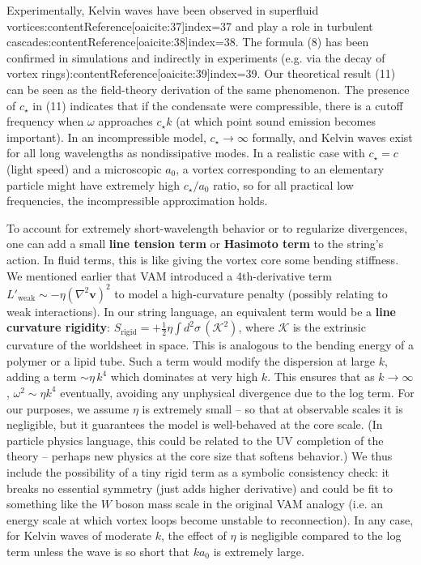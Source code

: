 \documentclass[12pt]{article}
\begin{document}
Experimentally, Kelvin waves have been observed in superfluid vortices:contentReference[oaicite:37]{index=37} and play a role in turbulent cascades:contentReference[oaicite:38]{index=38}. The formula (8) has been confirmed in simulations and indirectly in experiments (e.g. via the decay of vortex rings):contentReference[oaicite:39]{index=39}. Our theoretical result (11) can be seen as the field-theory derivation of the same phenomenon. The presence of $c_\star$ in (11) indicates that if the condensate were compressible, there is a cutoff frequency when $\omega$ approaches $c_\star k$ (at which point sound emission becomes important). In an incompressible model, $c_\star \to \infty$ formally, and Kelvin waves exist for all long wavelengths as nondissipative modes. In a realistic case with $c_\star = c$ (light speed) and a microscopic $a_0$, a vortex corresponding to an elementary particle might have extremely high $c_\star/a_0$ ratio, so for all practical low frequencies, the incompressible approximation holds.

To account for extremely short-wavelength behavior or to regularize divergences, one can add a small \textbf{line tension term} or \textbf{Hasimoto term} to the string’s action. In fluid terms, this is like giving the vortex core some bending stiffness. We mentioned earlier that VAM introduced a 4th-derivative term $L'_{\text{weak}} \sim -\eta (\nabla^2 \mathbf{v})^2$ to model a high-curvature penalty (possibly relating to weak interactions). In our string language, an equivalent term would be a \textbf{line curvature rigidity}: $S_{\text{rigid}} = + \frac{1}{2}\eta \int d^2\sigma\, (\mathcal{K}^2)$, where $\mathcal{K}$ is the extrinsic curvature of the worldsheet in space. This is analogous to the bending energy of a polymer or a lipid tube. Such a term would modify the dispersion at large $k$, adding a term $\sim \eta\, k^4$ which dominates at very high $k$. This ensures that as $k \to \infty$, $\omega^2 \sim \eta k^4$ eventually, avoiding any unphysical divergence due to the log term. For our purposes, we assume $\eta$ is extremely small – so that at observable scales it is negligible, but it guarantees the model is well-behaved at the core scale. (In particle physics language, this could be related to the UV completion of the theory – perhaps new physics at the core size that softens behavior.) We thus include the possibility of a tiny rigid term as a symbolic consistency check: it breaks no essential symmetry (just adds higher derivative) and could be fit to something like the $W$ boson mass scale in the original VAM analogy (i.e. an energy scale at which vortex loops become unstable to reconnection). In any case, for Kelvin waves of moderate $k$, the effect of $\eta$ is negligible compared to the log term unless the wave is so short that $k a_0$ is extremely large.
\end{document}
